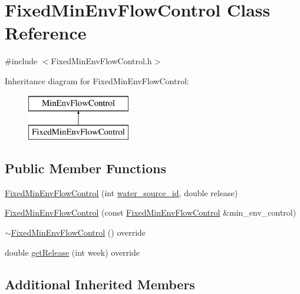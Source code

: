 \hypertarget{classFixedMinEnvFlowControl}{}\section{Fixed\+Min\+Env\+Flow\+Control Class Reference}
\label{classFixedMinEnvFlowControl}


{\ttfamily \#include $<$Fixed\+Min\+Env\+Flow\+Control.\+h$>$}

Inheritance diagram for Fixed\+Min\+Env\+Flow\+Control\+:\begin{figure}[H]
\begin{center}
\leavevmode
\includegraphics[height=2.000000cm]{classFixedMinEnvFlowControl}
\end{center}
\end{figure}
\subsection*{Public Member Functions}
\begin{DoxyCompactItemize}
\item 
\mbox{\hyperlink{classFixedMinEnvFlowControl_ab03711220b87d6490a4c2ca81fcc89a0}{Fixed\+Min\+Env\+Flow\+Control}} (int \mbox{\hyperlink{classMinEnvFlowControl_aada518a047598f386daec1d0358023aa}{water\+\_\+source\+\_\+id}}, double release)
\item 
\mbox{\hyperlink{classFixedMinEnvFlowControl_a57795231f747cae4a4b5b4cf9d4d044f}{Fixed\+Min\+Env\+Flow\+Control}} (const \mbox{\hyperlink{classFixedMinEnvFlowControl}{Fixed\+Min\+Env\+Flow\+Control}} \&min\+\_\+env\+\_\+control)
\item 
\mbox{\hyperlink{classFixedMinEnvFlowControl_ac63298347dcaccf755ea45d1e2f94bad}{$\sim$\+Fixed\+Min\+Env\+Flow\+Control}} () override
\item 
double \mbox{\hyperlink{classFixedMinEnvFlowControl_af3ef98eef6a7124738a3b54dcadf757f}{get\+Release}} (int week) override
\end{DoxyCompactItemize}
\subsection*{Additional Inherited Members}


